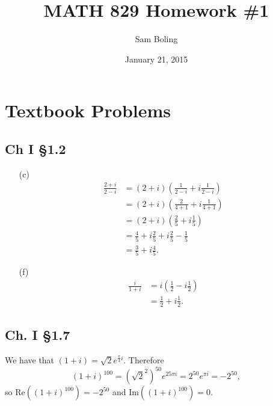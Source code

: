 \documentclass{article}
\title{MATH 829 Homework \#1}
\date{January 21, 2015}
\author{Sam Boling}
\newcounter{Problem}
\begin{document}
\begin{titlepage}
\maketitle
\end{titlepage}

\section{Textbook Problems}

\subsection*{Ch I \S 1.2}
\begin{itemize}
  \item[(c)]{
    \begin{align*}
       \frac{2 + i}{2 - i}
    &= (2+i)\left(\frac{1}{2 - i} + i\frac{1}{2 - i}\right) \\
    &= (2+i)\left(\frac{2}{4+1} + i\frac{1}{4 + 1}\right) \\
    &= (2+i)\left(\frac{2}{5} + i\frac{1}{5}\right) \\
    &= \frac{4}{5} + i\frac{2}{5} + i\frac{2}{5} - \frac{1}{5} \\
    &= \frac{3}{5} + i\frac{4}{5}.
    \end{align*}
  }
  \item[(f)]{
    \begin{align*}
       \frac{i}{1+i}
    &= i\left(\frac{1}{2} - i\frac{1}{2}\right) \\
    &= \frac{1}{2} + i\frac{1}{2}.
    \end{align*}
  }
\end{itemize}

\subsection*{Ch. I \S 1.7}
We have that $(1 + i) = \sqrt{2}e^{\frac{\pi}{4} i}$.
Therefore
$$
  (1 + i)^{100}
= (\sqrt{2}^2)^{50} e^{25 \pi i}
= 2^{50} e^{\pi i}
= -2^{50},
$$
so $\mathrm{Re}((1 + i)^{100}) = -2^{50}$ and
$\mathrm{Im}((1 + i)^{100}) = 0$.
\end{document}
